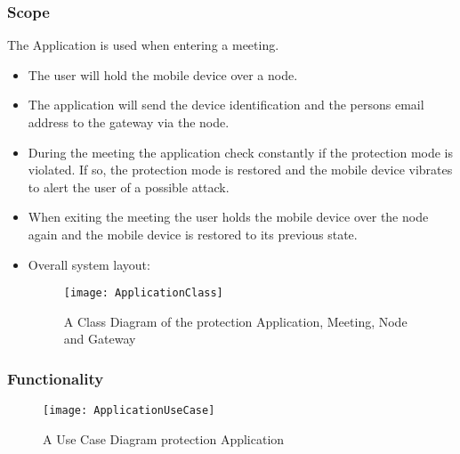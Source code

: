 		\subsubsection{Scope}
		    The Application is used when entering a meeting. 
		    \begin{itemize}
		    \item The user will hold the mobile device over a node.
		    \item The application will send the device identification and the persons email address to the gateway via the node. 
		    \item During the meeting the application check constantly if the protection mode is violated. If so, the protection mode is restored and the mobile device vibrates to alert the user of a possible attack.
		    \item When exiting the meeting the user holds the mobile device over the node again and the mobile device is restored to its previous state.
		    \item{ Overall system layout: 
		    
		    

		
		\begin{figure}[H]
 			 \centering
			  \texttt{[image: ApplicationClass]}
		 	 \caption{A Class Diagram of the protection Application, Meeting, Node and Gateway}
		\end{figure}}
		\end{itemize}
       
       
        \subsubsection{Functionality}

		\begin{figure}[H]
 			 \centering
			  \texttt{[image: ApplicationUseCase]}
		 	 \caption{A Use Case Diagram protection Application}
		\end{figure}


